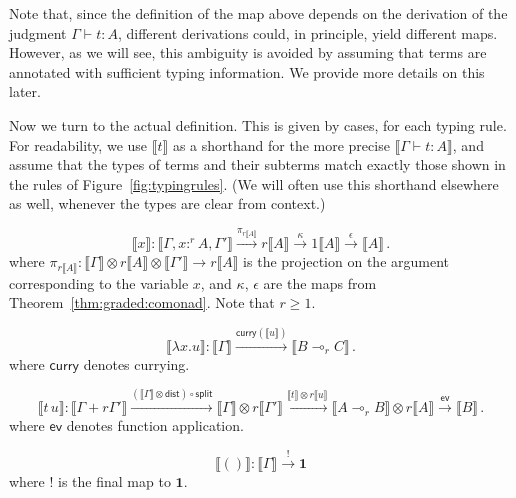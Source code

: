 \documentclass[a4paper,UKenglish,cleveref, autoref, thm-restate]{lipics-v2021}
\newcommand{\lol}{\mathbin{\multimap}}
\newcommand{\mprod}{\otimes}
\newcommand{\unit}{\mathbf{1}}
\newcommand{\scaling}{}
\newcommand{\splt}{\mathsf{split}}
\newcommand{\distribute}{\mathsf{dist}}
\newcommand{\ts}{\vdash}
\newcommand{\hastype}[3]{#1\ts #2 : #3}
\newcommand{\curry}{\mathsf{curry}}
\newcommand{\eval}{\mathsf{ev}}
\newcommand{\den}[1]{\llbracket #1\rrbracket}
\begin{document}
Note that, since the definition of the map above depends on the derivation of the judgment $\hastype{\Gamma}{t}{A}$, different derivations could, in principle, yield different maps. However, as we will see, this ambiguity is avoided by assuming that terms are annotated with sufficient typing information. We provide more details on this later.

Now we turn to the actual definition. This is given by cases, for each typing rule. For readability, we use $\den{t}$ as a shorthand for the more precise $\den{\hastype{\Gamma}{t}{A}}$, and assume that the types of terms and their subterms match exactly those shown in the rules of Figure~\ref{fig:typingrules}. 
(We will often use this shorthand elsewhere as well, whenever the types are clear from context.)

\begin{description}[font=\sc,wide]
\item[Case (var):]
\begin{equation*}
    \den{x} \colon 
    \den{\Gamma, x:^rA, \Gamma'} 
        \xrightarrow{\pi_{r\den{A}}} r\scaling\den{A}
        \xrightarrow{\kappa} 1\scaling\den{A}
        \xrightarrow{\epsilon} \den{A} \,.
\end{equation*}
where $\pi_{r\den{A}}\colon \den{\Gamma} \mprod r\den{A} \mprod \den{\Gamma'} \to r\den{A}$ is the projection on the argument corresponding to the variable $x$, and $\kappa$, $\epsilon$ are the maps from Theorem~\ref{thm:graded:comonad}. Note that $r\geq 1$.

\item[Case (abs):] 
\begin{equation*}
    \den{\lambda x.u} \colon 
    \den{\Gamma} 
        \xrightarrow{\curry(\den{u})} 
    \den{B \lol_r C} \,.
\end{equation*}
where $\curry$ denotes currying.

\item[Case (app):] 
\begin{equation*}
    \den{t\,u} \colon
    \den{\Gamma + r\scaling \Gamma'} 
        \xrightarrow{(\den\Gamma\mprod \distribute) \circ \splt} 
    \den\Gamma\mprod r \den{\Gamma'} 
        \xrightarrow{\den t\mprod r\den u}
    \den{A \lol_r B} \mprod r\den A
        \xrightarrow{\mathsf{ev}} 
    \den{B} \,.
\end{equation*}
where $\eval$ denotes function application.

\item[Case (unit):]
\begin{equation*}
    \den{()} \colon \den{\Gamma} \xrightarrow{!} \unit
\end{equation*}
where $!$ is the final map to $\unit$.


\end{description}
\end{document}
